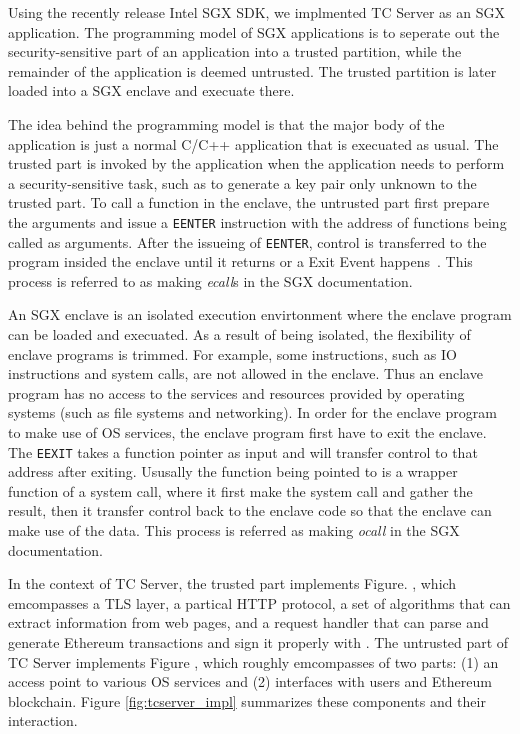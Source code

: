 
Using the recently release Intel SGX SDK, we implmented TC Server as an SGX
application.  The programming model of SGX applications is to seperate out the
security-sensitive part of an application into a trusted partition, while the
remainder of the application is deemed untrusted.  The trusted partition is
later loaded into a SGX enclave and execuate there. 

The idea behind the programming model is that the major body of the application
is just a normal C/C++ application that is execuated as usual. The trusted part
is invoked by the application when the application needs to perform a
security-sensitive task, such as to generate a key pair only unknown to the
trusted part. To call a function in the enclave, the untrusted part first
prepare the arguments and issue a \texttt{EENTER} instruction with the address
of functions being called as arguments.  After the issueing of \texttt{EENTER},
control is transferred to the program insided the enclave until it returns or a
Exit Event happens~\cite{sgxman}. This process is referred to as making
\emph{ecall}s in the SGX documentation.

An SGX enclave is an isolated execution envirtonment where the enclave program
can be loaded and execuated. As a result of being isolated, the flexibility of
enclave programs is trimmed. For example, some instructions, such as IO
instructions and system calls, are not allowed in the enclave.
Thus an enclave program has no access to the services and resources provided by
operating systems (such as file systems and networking). In order for the enclave
program to make use of OS services, the enclave program first have to exit the 
enclave. The \texttt{EEXIT} takes a function pointer as input and will transfer
control to that address after exiting. Ususally the function being pointed to
is a wrapper function of a system call, where it first make the system call and
gather the result, then it transfer control back to the enclave code so that the
enclave can make use of the data. This process is referred as making \emph{ocall}
in the SGX documentation.

In the context of TC Server, the trusted part implements Figure. , which emcompasses a TLS layer, a partical HTTP protocol, a set of
algorithms that can extract information from web pages, and a request handler
that can parse and generate Ethereum transactions and sign it properly with
\skTC.  The untrusted part of TC Server implements Figure ,
which roughly emcompasses of two parts: (1) an access point to various OS
services and (2) interfaces with users and Ethereum blockchain. Figure
\ref{fig:tcserver_impl} summarizes these components and their interaction.

